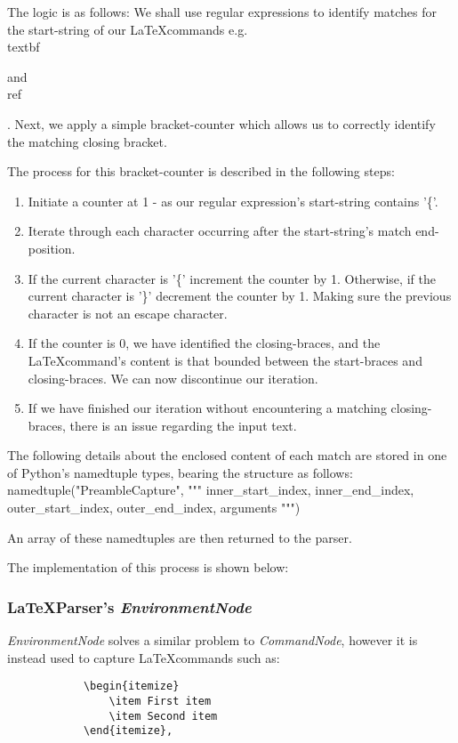 		The logic is as follows:
		We shall use regular expressions to identify matches for the start-string of our \LaTeX commands e.g. \\textbf{ and \\ref{. Next, we apply a simple bracket-counter which allows us to correctly identify the matching closing bracket.
				
		The process for this bracket-counter is described in the following steps:
		\begin{enumerate}
			\item Initiate a counter at 1 - as our regular expression's start-string contains '\{'.
			\item Iterate through each character occurring after the start-string's match end-position.
			\item If the current character is '\{' increment the counter by 1. Otherwise, if the current character is '\}' decrement the counter by 1. Making sure the previous character is not an escape character.
			\item If the counter is 0, we have identified the closing-braces, and the \LaTeX command's content is that bounded between the start-braces and closing-braces. We can now discontinue our iteration.
			\item If we have finished our iteration without encountering a matching closing-braces, there is an issue regarding the input text.
		\end{enumerate}
		
		The following details about the enclosed content of each match are stored in one of Python's namedtuple types, bearing the structure as follows:
			namedtuple("PreambleCapture", """
				inner\_start\_index, inner\_end\_index,
				outer\_start\_index, outer\_end\_index,
				arguments
			""")
		
		An array of these namedtuples are then returned to the parser.
		
		The implementation of this process is shown below:
		
	\subsubsection*{\LaTeX Parser's \textit{EnvironmentNode}}
		\textit{EnvironmentNode} solves a similar problem to \textit{CommandNode}, however it is instead used to capture \LaTeX commands such as:
		\begin{verbatim}
			\begin{itemize} 
				\item First item 
				\item Second item
			\end{itemize},
			

\end{verbatim}}}
